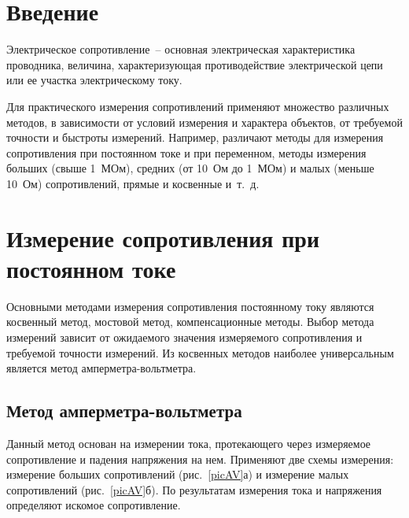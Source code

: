 \documentclass[pscyr,titlepage]{hedreport}
\newcommand{\Pic}[1]{\ref{pic#1}}
\newcommand{\pic}[1]{рис.~\Pic{#1}}
\begin{document}
  \maketitle
  \tableofcontents

  \section*{Введение}
  
  Электрическое сопротивление~-- основная электрическая характеристика
  проводника, величина, характеризующая противодействие электрической цепи или
  ее участка электрическому току.

  Для практического измерения сопротивлений применяют множество различных
  методов, в зависимости от условий измерения и характера объектов, от требуемой
  точности и быстроты измерений. Например, различают методы для измерения
  сопротивления при постоянном токе и при переменном, методы измерения
  больших (свыше 1~МОм), средних (от 10~Ом до 1~МОм) и малых (меньше 10~Ом)
  сопротивлений, прямые и косвенные и~т.~д.

  \section{Измерение сопротивления при постоянном токе}

  Основными методами измерения сопротивления постоянному току являются косвенный
  метод, мостовой метод, компенсационные методы. Выбор метода измерений зависит
  от ожидаемого значения измеряемого сопротивления и требуемой точности
  измерений. Из косвенных методов наиболее универсальным является метод
  амперметра-вольтметра.

  \subsection{Метод амперметра-вольтметра}

  Данный метод основан на измерении тока, протекающего через измеряемое
  сопротивление и падения напряжения на нем. Применяют две схемы измерения:
  измерение больших сопротивлений (\pic{AV}а) и измерение малых сопротивлений
  (\pic{AV}б). По результатам измерения тока и напряжения определяют искомое
  сопротивление.
  
\end{document}
